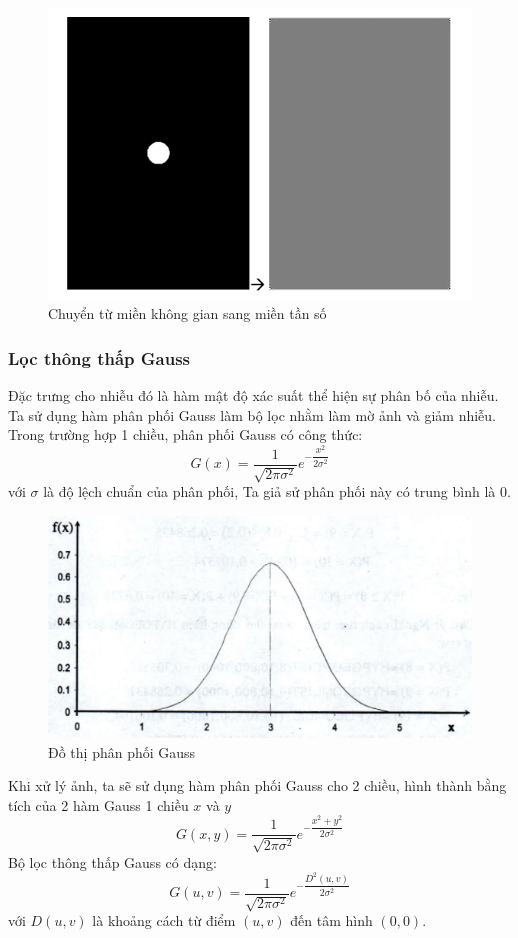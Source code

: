 \documentclass[12pt,a4paper]{report}
\numberwithin{equation}{section}
\theoremstyle{definition} %
\begin{document}
\begin{figure}[H]
\centering
\includegraphics[width=0.7\linewidth]{img/mienKG_mienTS.png}
\caption{Chuyển từ miền không gian sang miền tần số}
\end{figure}

\subsubsection{Lọc thông thấp Gauss}

Đặc trưng cho nhiễu đó là hàm mật độ xác suất thể hiện sự phân bố của nhiễu. Ta sử dụng hàm phân phối Gauss làm bộ lọc nhằm làm mờ ảnh và giảm nhiễu. Trong trường hợp 1 chiều, phân phối Gauss có công thức:
\begin{equation}
G(x) = \dfrac{1}{\sqrt{2\pi \sigma^2}}e^{-\dfrac{x^2}{2\sigma^2}}
\end{equation}
với $\sigma$ là độ lệch chuẩn của phân phối, Ta giả sử phân phối này có trung bình là 0.
\begin{figure}[H]
\centering
\includegraphics[width=0.8\linewidth]{img/phanphoigauss.png}
\caption{Đồ thị phân phối Gauss}
\end{figure}
Khi xử lý ảnh, ta sẽ sử dụng hàm phân phối Gauss cho 2 chiều, hình thành bằng tích của 2 hàm Gauss 1 chiều $x$ và $y$ 
\begin{equation}
G(x,y) =  \dfrac{1}{\sqrt{2\pi \sigma^2}}e^{-\dfrac{x^2+y^2}{2\sigma^2}}
\end{equation}
Bộ lọc thông thấp Gauss có dạng:
\begin{equation}
G(u,v) =  \dfrac{1}{\sqrt{2\pi \sigma^2}}e^{-\dfrac{D^2(u,v)}{2\sigma^2}}
\end{equation}
với $D(u,v)$ là khoảng cách từ điểm $(u,v)$ đến tâm hình $(0,0)$.
\end{document}
